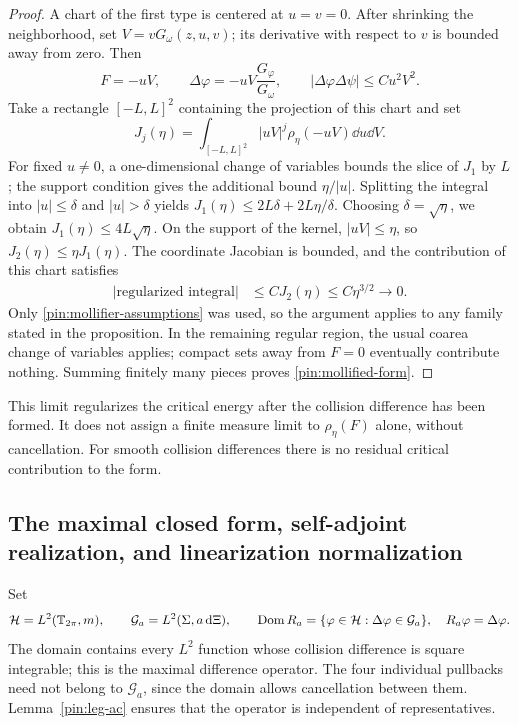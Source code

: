 \begin{proof}
A chart of the first type is centered at $u=v=0$. After shrinking
the neighborhood, set $V=vG_\omega(z,u,v)$; its derivative with
respect to $v$ is bounded away from zero. Then
\begin{equation}
      F=-uV,\qquad
      \Delta\varphi=-uV\frac{G_\varphi}{G_\omega},\qquad
      |\Delta\varphi\Delta\psi|\le C u^2V^2.
 \label{pin:nonzero-G}
\end{equation}
Take a rectangle $[-L,L]^2$ containing the projection of this chart and set
\[
 J_j(\eta)=\int_{[-L,L]^2}|uV|^j\rho_\eta(-uV)\dd u\dd V.
\]
For fixed $u\ne0$, a one-dimensional change of variables bounds the
slice of $J_1$ by $L$; the support condition gives the additional bound
$\eta/|u|$. Splitting the integral into $|u|\le\delta$ and
$|u|>\delta$ yields $J_1(\eta)\le2L\delta+2L\eta/\delta$.
Choosing $\delta=\sqrt\eta$, we obtain
$J_1(\eta)\le4L\sqrt\eta$. On the support of the kernel,
$|uV|\le\eta$, so $J_2(\eta)\le\eta J_1(\eta)$. The coordinate
Jacobian is bounded, and the contribution of this chart satisfies
\begin{align}
 \left|\text{regularized integral}\right|
 &\le C J_2(\eta)\le C\eta^{3/2}\longrightarrow0.
 \label{pin:product-mollifier}
\end{align}
Only \eqref{pin:mollifier-assumptions} was used, so the argument applies
to any family stated in the proposition. In the remaining regular
region, the usual coarea change of variables applies; compact sets away
from $F=0$ eventually contribute nothing. Summing finitely many pieces
proves \eqref{pin:mollified-form}.
\end{proof}

This limit regularizes the critical energy after the collision
difference has been formed. It does not assign a finite measure limit
to $\rho_\eta(F)$ alone, without cancellation. For smooth collision
differences there is no residual critical contribution to the form.

\subsection{The maximal closed form, self-adjoint realization, and linearization normalization}
\label{pin:closed-realization}

Set
\begin{equation}
 \mathcal H=L^2(\mathbb T_{2\pi},m),\qquad
 \mathcal G_a=L^2(\Sigma,a\,\mathrm d\Xi),\qquad
 \operatorname{Dom} R_a=\{\varphi\in\mathcal H:\Delta\varphi\in\mathcal G_a\},
 \quad R_a\varphi=\Delta\varphi.
 \label{pin:maximal-difference}
\end{equation}
The domain contains every $L^2$ function whose collision difference is
square integrable; this is the maximal difference operator. The four
individual pullbacks need not belong to $\mathcal G_a$, since the
domain allows cancellation between them. Lemma~\ref{pin:leg-ac}
ensures that the operator is independent of representatives.

